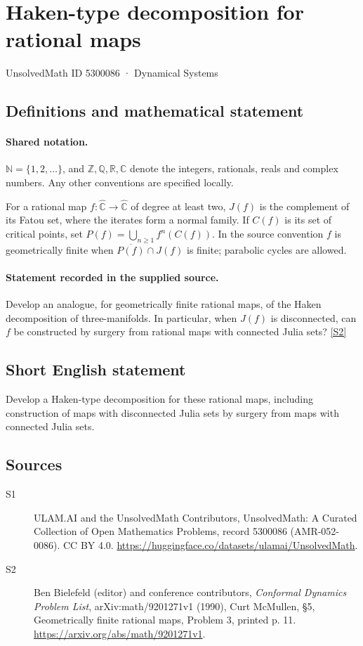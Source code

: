 \documentclass[11pt]{article}
\newcommand{\sref}[2]{\hyperlink{source:#1:#2}{[S#2]}}
\begin{document}
\setcounter{section}{5300085}
\section{Haken-type decomposition for rational maps}\label{5300086}
{\small\sffamily UnsolvedMath ID 5300086 · Dynamical Systems}
\subsection{Definitions and mathematical statement}

\paragraph{Shared notation.}$\mathbb N=\{1,2,\ldots\}$, and $\mathbb Z,\mathbb Q,\mathbb R,\mathbb C$ denote the integers, rationals, reals and complex numbers. Any other conventions are specified locally.


For a rational map $f:\widehat{\mathbb C}\to\widehat{\mathbb C}$ of degree at least two, $J(f)$ is the complement of its Fatou set, where the iterates form a normal family. If $C(f)$ is its set of critical points, set $P(f)=\bigcup_{n\geq1}f^n(C(f))$. In the source convention $f$ is geometrically finite when $\overline{P(f)}\cap J(f)$ is finite; parabolic cycles are allowed.
\paragraph{Statement recorded in the supplied source.}
Develop an analogue, for geometrically finite rational maps, of the Haken decomposition of three-manifolds. In particular, when $J(f)$ is disconnected, can $f$ be constructed by surgery from rational maps with connected Julia sets? \sref{5300086}{2}
\subsection{Short English statement}
Develop a Haken-type decomposition for these rational maps, including construction of maps with disconnected Julia sets by surgery from maps with connected Julia sets.
\subsection{Sources}
\begin{description}
\item[\hypertarget{source:5300086:1}{S1}] ULAM.AI and the UnsolvedMath Contributors, UnsolvedMath: A Curated Collection of Open Mathematics Problems, record 5300086 (AMR-052-0086). CC BY 4.0. \url{https://huggingface.co/datasets/ulamai/UnsolvedMath}.
\item[\hypertarget{source:5300086:2}{S2}] Ben Bielefeld (editor) and conference contributors, \emph{Conformal Dynamics Problem List}, arXiv:math/9201271v1 (1990), Curt McMullen, \S5, Geometrically finite rational maps, Problem 3, printed p. 11. \url{https://arxiv.org/abs/math/9201271v1}.
\end{description}
\label{end:5300086}
\end{document}

